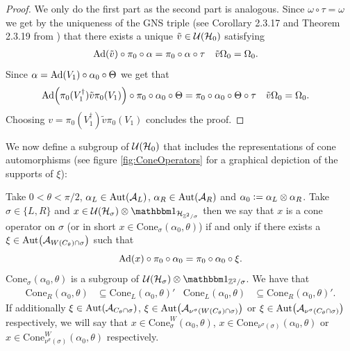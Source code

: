 \documentclass[11pt,a4paper,twoside]{article}
\numberwithin{equation}{section}
\begin{document}
	\begin{proof}
		We only do the first part as the second part is analogous. Since $\omega\circ\tau=\omega$ we get by the uniqueness of the GNS triple (see Corollary 2.3.17 and Theorem 2.3.19 from \cite{bratteli1979operator}) that there exists a unique $\tilde{v}\in\mathcal U(\mathcal H_0)$ satisfying
		\begin{align}
			\Ad{\tilde{v}}\circ\pi_0\circ\alpha&=\pi_0\circ\alpha\circ\tau&\tilde{v}\Omega_0&=\Omega_0.
		\end{align}
		Since $\alpha=\Ad{V_1}\circ\alpha_0\circ\Theta$ we get that
		\begin{align}
			\Ad{\pi_0(V_1^\dagger)\tilde{v}\pi_0(V_1)}\circ\pi_0\circ\alpha_0\circ\Theta&=\pi_0\circ\alpha_0\circ\Theta\circ\tau&\tilde{v}\Omega_0&=\Omega_0.
		\end{align}
		Choosing $v=\pi_0(V_1^\dagger)\tilde{v}\pi_0(V_1)$  concludes the proof.
	\end{proof}
	We now define a subgroup of $\mathcal U(\mathcal H_0)$ that includes the representations of cone automorphisms (see figure \ref{fig:ConeOperators} for a graphical depiction of the supports of $\xi$):
	\begin{definition}\label{def:ConeOperators}
		Take $0<\theta<\pi/2$, $\alpha_L\in\Aut{\AA_{L}}$, $\alpha_R\in\Aut{\AA_{R}}$ and $\alpha_0\vcentcolon= \alpha_L\otimes\alpha_R$. Take $\sigma\in\{L,R\}$ and $x\in\UU(\HH_{\sigma})\otimes\id_{\HH_{\ZZ^2/\sigma}}$ then we say that $x$ is a cone operator on $\sigma$ (or in short $x\in\textrm{Cone}_{\sigma}(\alpha_0,\theta)$) if and only if there exists a $\xi\in\Aut{\AA_{W(C_\theta)\cap\sigma}}$ such that
		\begin{equation}
			\Ad{x}\circ\pi_0\circ\alpha_0=\pi_0\circ\alpha_0\circ\xi.
		\end{equation}
		$\textrm{Cone}_\sigma(\alpha_0,\theta)$ is a subgroup of $\UU(\HH_\sigma)\otimes\id_{\ZZ^2/\sigma}$. We have that
		\begin{align}\label{eq:CommutantPropertyCones}
			\textrm{Cone}_R(\alpha_0,\theta)&\subseteq\textrm{Cone}_L(\alpha_0,\theta)'&\textrm{Cone}_L(\alpha_0,\theta)&\subseteq\textrm{Cone}_R(\alpha_0,\theta)'.
		\end{align}
		If additionally $\xi\in\Aut{\AA_{C_\theta\cap\sigma}}$, $\xi\in\Aut{\AA_{\nu^\sigma(W(C_\theta)\cap\sigma)}}$ or $\xi\in\Aut{\AA_{\nu^\sigma(C_\theta\cap\sigma)}}$ respectively, we will say that $x\in\textrm{Cone}_\sigma^W(\alpha_0,\theta)$, $x\in\textrm{Cone}_{\nu^\sigma(\sigma)}(\alpha_0,\theta)$ or $x\in\textrm{Cone}_{\nu^\sigma(\sigma)}^W(\alpha_0,\theta)$ respectively.
	\end{definition}
\end{document}
